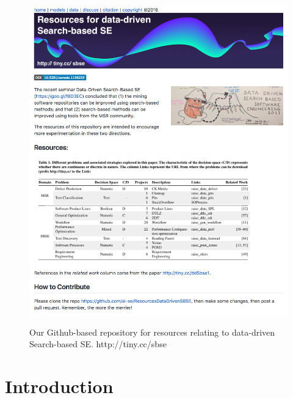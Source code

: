 \documentclass[table, xcdraw, sigconf,review, anonymous]{acmart}
\begin{document}


\keywords{}


\maketitle
\pagestyle{plain}
% 



\begin{figure}[!t]
{\center
\includegraphics[width=5.5in]{img/page1.png}}
\caption{Our Github-based repository  for resources relating to data-driven Search-based SE.
http://tiny.cc/sbse}\label{fig:one}
\end{figure}

\section{Introduction}
\end{document}
